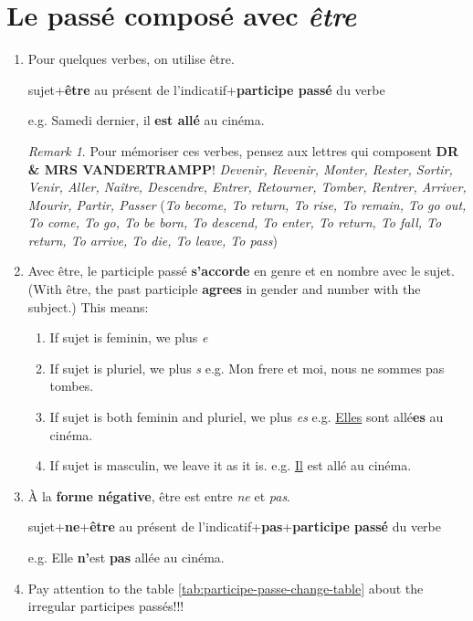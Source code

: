 \documentclass[math,code]{amznotes}
\theoremstyle{remark}
\newtheorem*{remark}{Remark}
\begin{document}
\section{Le passé composé avec \textit{être}}
\begin{enumerate}
    \item Pour quelques verbes, on utilise être. \newline
    \centerline{sujet+\textbf{être} au présent de l'indicatif+\textbf{participe passé} du verbe} \newline
    e.g. Samedi dernier, il \textbf{est allé} au cinéma. \newline
    \begin{notebox}
        \begin{remark}
            Pour mémoriser ces verbes, pensez aux lettres qui composent \textbf{DR \& MRS VANDERTRAMPP}! \newline
            \textit{Devenir, Revenir, Monter, Rester, Sortir, Venir, Aller, Naître, Descendre, Entrer, Retourner, Tomber, Rentrer, Arriver, Mourir, Partir, Passer} \newline
            (\textit{To become, To return, To rise, To remain, To go out, To come, To go, To be born, To descend, To enter, To return, To fall, To return, To arrive, To die, To leave, To pass})
        \end{remark}
    \end{notebox}
    \item Avec être, le participle passé \textbf{s'accorde} en genre et en nombre avec le sujet. (With être, the past participle \textbf{agrees} in gender and number with the subject.) This means: 
    \begin{enumerate}
        \item If sujet is feminin, we plus \textit{e}
        \item If sujet is pluriel, we plus \textit{s} e.g. Mon frere et moi, nous ne sommes pas tombes.
        \item If sujet is both feminin and pluriel, we plus \textit{es} e.g. \underline{Elles} sont allé\textbf{es} au cinéma.
        \item If sujet is masculin, we leave it as it is. e.g. \underline{Il} est allé au cinéma. 
    \end{enumerate}
    \item À la \textbf{forme négative}, être est entre \textit{ne} et \textit{pas}. \newline
    \centerline{sujet+\textbf{ne}+\textbf{être} au présent de l'indicatif+\textbf{pas}+\textbf{participe passé} du verbe} \newline
    e.g. Elle \textbf{n'}est \textbf{pas} allée au cinéma.
    \item Pay attention to the table \ref{tab:participe-passe-change-table} about the irregular participes passés!!!
\end{enumerate}
\end{document}
